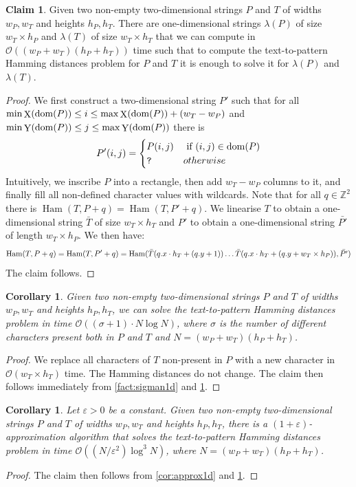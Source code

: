 \documentclass[11pt, letterpaper]{article}
\theoremstyle{plain}
\newtheorem{corollary}[fact]{Corollary}
\theoremstyle{definition}
\newtheorem{claim}{Claim}
\theoremstyle{remark}
\newcommand{\Z}{\mathbb{Z}}
\renewcommand{\O}{\mathcal{O}}
\DeclareMathOperator*{\X}{X}
\DeclareMathOperator*{\Y}{Y}
\DeclareMathOperator*{\Ham}{Ham}
\begin{document}
\begin{claim}
\label{claim:padding}
Given two non-empty two-dimensional strings $P$ and $T$ of widths $w_P, w_T$ and heights $h_P, h_T$. There are one-dimensional strings $\lambda(P)$ of size $w_T \times h_P$ and $\lambda(T)$ of size $w_T \times h_T$ that we can compute in $\O((w_P+w_T)(h_P+h_T))$ time such that to compute the text-to-pattern Hamming distances problem for $P$ and $T$ it is enough to solve it for $\lambda(P)$ and $\lambda(T)$. 
\end{claim}
\begin{proof}
We first construct a two-dimensional string $P'$ such that for all $\min \X(\d{P}) \le i \le \max \X(\d{P})+(w_T-w_P)$ and $\min \Y(\d{P}) \le j \le \max \Y(\d{P})$ there is
%
$$
P'(i,j) = 
\begin{cases}
P(i,j) & \text{ if } (i,j) \in \operatorname*{dom}(P)\\
\texttt{?} & { otherwise}
\end{cases}
$$
%
Intuitively, we inscribe $P$ into a rectangle, then add $w_T-w_P$ columns to it, and finally fill all non-defined character values with wildcards. Note that for all $q \in \Z^2$ there is $\Ham(T,P+q) = \Ham(T,P'+q)$. We linearise $T$ to obtain a one-dimensional string $\bar{T}$ of size $w_T \times h_T$ and $P'$ to obtain a one-dimensional string $\bar{P'}$ of length $w_T \times h_P$. We then have:
%
$$\Ham(T, P+q) = \Ham(T,P'+q) = \Ham(\bar{T}(\x{q} \cdot h_T + (\y{q}+1)) \ldots \bar{T}(\x{q} \cdot h_T + (\y{q}+w_T \times h_P)), \bar{P'})$$
%
The claim follows. 
\end{proof}

\begin{corollary}\label{cor:sigman2d}
Given two non-empty two-dimensional strings $P$ and $T$ of widths $w_P, w_T$ and heights $h_P, h_T$, we can solve the text-to-pattern Hamming distances problem in time $\O((\sigma+1) \cdot N \log N)$, where $\sigma$ is the number of different characters present both in $P$ and $T$ and $N = (w_P + w_T)(h_P + h_T)$.
\end{corollary}
\begin{proof}
We replace all characters of $T$ non-present in $P$ with a new character in $\O(w_T\times h_T)$ time. The Hamming distances do not change. The claim then follows immediately from \cref{fact:sigman1d} and \cref{claim:padding}. 
\end{proof}


\begin{corollary}\label{cor:approx2d}
Let $\varepsilon > 0$ be a constant. Given two non-empty two-dimensional strings $P$ and $T$ of widths $w_P, w_T$ and heights $h_P, h_T$, there is a $(1+\varepsilon)$-approximation algorithm that solves the text-to-pattern Hamming distances problem in time $\O((N/\varepsilon^2)  \log^3 N)$, where $N = (w_P + w_T)(h_P + h_T)$.
\end{corollary}
\begin{proof}
The claim then follows from \cref{cor:approx1d} and \cref{claim:padding}. 
\end{proof}
\end{document}
